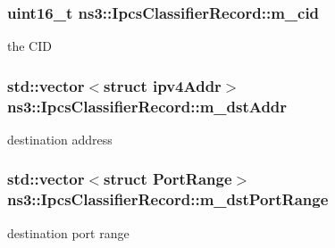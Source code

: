 \subsubsection[{\texorpdfstring{m\+\_\+cid}{m_cid}}]{\setlength{\rightskip}{0pt plus 5cm}uint16\+\_\+t ns3\+::\+Ipcs\+Classifier\+Record\+::m\+\_\+cid\hspace{0.3cm}{\ttfamily [private]}}\hypertarget{classns3_1_1IpcsClassifierRecord_ab1c9aa611b20574c557841cc23b2762b}{}\label{classns3_1_1IpcsClassifierRecord_ab1c9aa611b20574c557841cc23b2762b}


the C\+ID 

\subsubsection[{\texorpdfstring{m\+\_\+dst\+Addr}{m_dstAddr}}]{\setlength{\rightskip}{0pt plus 5cm}std\+::vector$<$struct {\bf ipv4\+Addr}$>$ ns3\+::\+Ipcs\+Classifier\+Record\+::m\+\_\+dst\+Addr\hspace{0.3cm}{\ttfamily [private]}}\hypertarget{classns3_1_1IpcsClassifierRecord_a9c1f0a02b48ca1a7f54c655f26779812}{}\label{classns3_1_1IpcsClassifierRecord_a9c1f0a02b48ca1a7f54c655f26779812}


destination address 

\subsubsection[{\texorpdfstring{m\+\_\+dst\+Port\+Range}{m_dstPortRange}}]{\setlength{\rightskip}{0pt plus 5cm}std\+::vector$<$struct {\bf Port\+Range}$>$ ns3\+::\+Ipcs\+Classifier\+Record\+::m\+\_\+dst\+Port\+Range\hspace{0.3cm}{\ttfamily [private]}}\hypertarget{classns3_1_1IpcsClassifierRecord_a5605fcdc93dfbdc7c64f3b203e002061}{}\label{classns3_1_1IpcsClassifierRecord_a5605fcdc93dfbdc7c64f3b203e002061}


destination port range 

